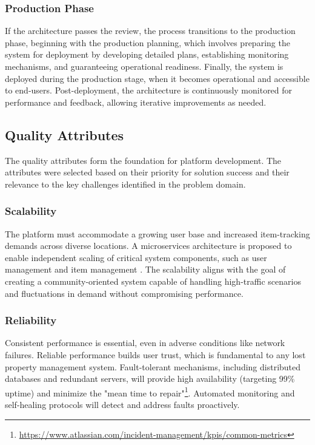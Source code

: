 \subsubsection{Production Phase}

If the architecture passes the review, the process transitions to the production phase, beginning with the production planning, which involves preparing the system for deployment by developing detailed plans, establishing monitoring mechanisms, and guaranteeing operational readiness. Finally, the system is deployed during the production stage, when it becomes operational and accessible to end-users. Post-deployment, the architecture is continuously monitored for performance and feedback, allowing iterative improvements as needed.


\subsection{Quality Attributes} \label{section:quality_attributes}

The quality attributes form the foundation for platform development. The attributes were selected based on their priority for solution success and their relevance to the key challenges identified in the problem domain.

\subsubsection{Scalability}

The platform must accommodate a growing user base and increased item-tracking demands across diverse locations. A microservices architecture is proposed to enable independent scaling of critical system components, such as user management and item management \cite{Al-Debagy2021}. The scalability aligns with the goal of creating a community-oriented system capable of handling high-traffic scenarios and fluctuations in demand without compromising performance.

\subsubsection{Reliability} 

Consistent performance is essential, even in adverse conditions like network failures. Reliable performance builds user trust, which is fundamental to any lost property management system. Fault-tolerant mechanisms, including distributed databases and redundant servers, will provide high availability (targeting 99\% uptime) and minimize the "mean time to repair"\footnote{\url{https://www.atlassian.com/incident-management/kpis/common-metrics}}. Automated monitoring and self-healing protocols will detect and address faults proactively.

